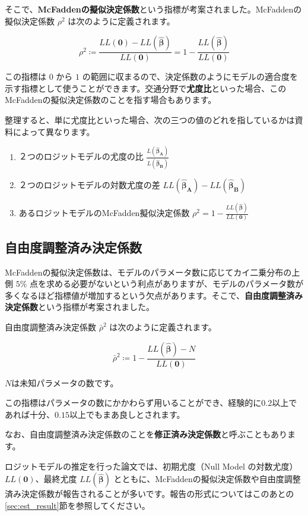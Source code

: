 そこで、\textbf{McFaddenの擬似決定係数}という指標が考案されました。McFaddenの擬似決定係数 $\rho^2$ は次のように定義されます。

\begin{equation}
    \rho^2 \coloneq \frac{LL(\bm 0)-LL(\bm{\hat\beta})}{LL(\bm 0)} = 1-\frac{LL(\bm{\hat\beta})}{LL(\bm 0)}
\end{equation}

この指標は $0$ から $1$ の範囲に収まるので、決定係数のようにモデルの適合度を示す指標として使うことができます。交通分野で\textbf{尤度比}といった場合、このMcFaddenの擬似決定係数のことを指す場合もあります。

整理すると、単に尤度比といった場合、次の三つの値のどれを指しているかは資料によって異なります。

\begin{enumerate}
    \item ２つのロジットモデルの尤度の比 $\frac{L(\bm{\hat\beta_A})}{L(\bm{\hat\beta_B})}$
    \item ２つのロジットモデルの対数尤度の差 $LL(\bm{\hat\beta_A})-LL(\bm{\hat\beta_B})$
    \item あるロジットモデルのMcFadden擬似決定係数 $\rho^2=1-\frac{LL(\bm{\hat\beta})}{LL(\bm 0)}$
\end{enumerate}

\subsection{自由度調整済み決定係数}

McFaddenの擬似決定係数は、モデルのパラメータ数に応じてカイ二乗分布の上側 $5\%$ 点を求める必要がないという利点がありますが、モデルのパラメータ数が多くなるほど指標値が増加するという欠点があります。そこで、\textbf{自由度調整済み決定係数}という指標が考案されました。

自由度調整済み決定係数 $\bar\rho^2$ は次のように定義されます。

\begin{equation}
    \bar\rho^2 \coloneq 1-\frac{LL(\bm{\hat\beta})-N}{LL(\bm 0)}
\end{equation}

$N$は未知パラメータの数です。

この指標はパラメータの数にかかわらず用いることができ、経験的に$0.2$以上であれば十分、$0.15$以上でもまあ良しとされます。

なお、自由度調整済み決定係数のことを\textbf{修正済み決定係数}と呼ぶこともあります。

ロジットモデルの推定を行った論文では、初期尤度（Null Model の対数尤度）$LL(\bm 0)$、最終尤度 $LL(\bm{\hat\beta})$ とともに、McFaddenの擬似決定係数や自由度調整済み決定係数が報告されることが多いです。報告の形式についてはこのあとの\ref{sec:est_result}節を参照してください。